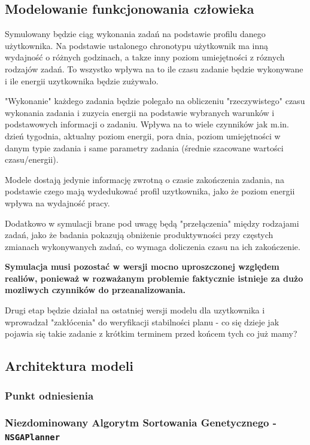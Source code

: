 \subsection{Modelowanie funkcjonowania człowieka}\label{section_experiment_human}
Symulowany będzie ciąg wykonania zadań na podstawie profilu danego użytkownika. Na podstawie ustalonego chronotypu użytkownik ma inną wydajność o różnych godzinach, a takze inny poziom umiejętności z róznych rodzajów zadań. To wszystko wpływa na to ile czasu zadanie będzie wykonywane i ile energii uzytkownika będzie zużywało.

"Wykonanie" każdego zadania będzie polegało na obliczeniu "rzeczywistego" czasu wykonania zadania i zuzycia energii na podstawie wybranych warunków i podstawowych informacji o zadaniu. Wpływa na to wiele czynników jak m.in. dzień tygodnia, aktualny poziom energii, pora dnia, poziom umiejętności w danym typie zadania i same parametry zadania (średnie szacowane wartości czasu/energii).

Modele dostają jedynie informację zwrotną o czasie zakończenia zadania, na podstawie czego mają wydedukować profil uzytkownika, jako że poziom energii wpływa na wydajność pracy.

Dodatkowo w symulacji brane pod uwagę będą "przełączenia" między rodzajami zadań, jako że badania pokazują obniżenie produktywności przy częstych zmianach wykonywanych zadań, co wymaga doliczenia czasu na ich zakończenie.

\textbf{Symulacja musi pozostać w wersji mocno uproszczonej względem realiów, ponieważ w rozważanym problemie faktycznie istnieje za dużo mozliwych czynników do przeanalizowania.}

Drugi etap będzie działał na ostatniej wersji modelu dla uzytkownika i wprowadzał "zakłócenia" do weryfikacji stabilności planu - co się dzieje jak pojawia się takie zadanie z krótkim terminem przed końcem tych co już mamy?

\subsection{Architektura modeli}\label{section_experiment_models}

\subsubsection{Punkt odniesienia}\label{section_experiment_models_base}

\subsubsection{Niezdominowany Algorytm Sortowania Genetycznego - \texttt{NSGAPlanner}}\label{section_experiment_models_NSGA}

